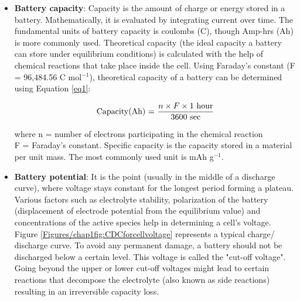 \begin{itemize}
\item \textbf{Battery capacity}: Capacity is the amount of charge or energy stored in a battery. Mathematically, it is evaluated by integrating current over time. The fundamental units of battery capacity is coulombs (C), though Amp-hrs (Ah) is more commonly used.  Theoretical capacity (the ideal capacity a battery can store under equilibrium conditions) is calculated with the help of chemical reactions that take place inside the cell. Using Faraday's constant (F = 96,484.56 C mol$^{-1}$), theoretical capacity of a battery can be determined using Equation \ref{eq1}:

\begin{equation} \label{eq1}
  \text{Capacity(Ah) = } \frac{n \times F \times 1 \text{ hour}}{3600 \text{ sec}}\\
\end{equation}

where n = number of electrons participating in the chemical reaction \\
F = Faraday's constant. Specific capacity is the capacity stored in a material per unit mass. The most commonly used unit is mAh g$^{-1}$. \\
\item \textbf{Battery potential}: It is the point (usually in the middle of a discharge curve), where voltage stays constant for the longest period forming a plateau. Various factors such as electrolyte stability, polarization of the battery (displacement of electrode potential from the equilibrium value) and concentrations of the active species help in determining a cell's voltage. Figure \ref{Figures/chap1fig:CDCforcellvoltage} represents a typical charge/ discharge curve. To avoid any permanent damage, a battery should not be discharged below a certain level. This voltage is called the "cut-off voltage". Going beyond the upper or lower cut-off voltages might lead to certain reactions that decompose the electrolyte (also known as side reactions) resulting in an irreversible capacity loss.\\


\end{itemize}
